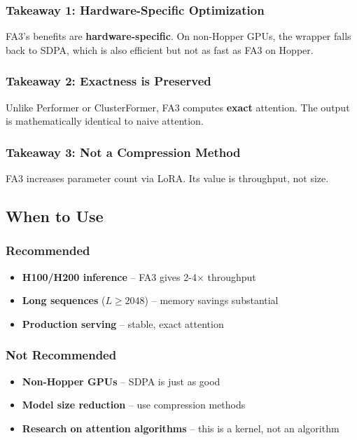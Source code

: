 \subsubsection{Takeaway 1: Hardware-Specific Optimization}

FA3's benefits are \textbf{hardware-specific}. On non-Hopper GPUs, the wrapper 
falls back to SDPA, which is also efficient but not as fast as FA3 on 
Hopper.

\subsubsection{Takeaway 2: Exactness is Preserved}

Unlike Performer or ClusterFormer, FA3 computes \textbf{exact} attention. The 
output is mathematically identical to naive attention.

\subsubsection{Takeaway 3: Not a Compression Method}

FA3 increases parameter count via LoRA. Its value is throughput, not size.

\subsection{When to Use}

\subsubsection{Recommended}
\begin{itemize}
\item \textbf{H100/H200 inference} -- FA3 gives 2-4$\times$ throughput
\item \textbf{Long sequences} ($L \geq 2048$) -- memory savings substantial
\item \textbf{Production serving} -- stable, exact attention

\end{itemize}
\subsubsection{Not Recommended}
\begin{itemize}
\item \textbf{Non-Hopper GPUs} -- SDPA is just as good
\item \textbf{Model size reduction} -- use compression methods
\item \textbf{Research on attention algorithms} -- this is a kernel, not an algorithm

\end{itemize}

